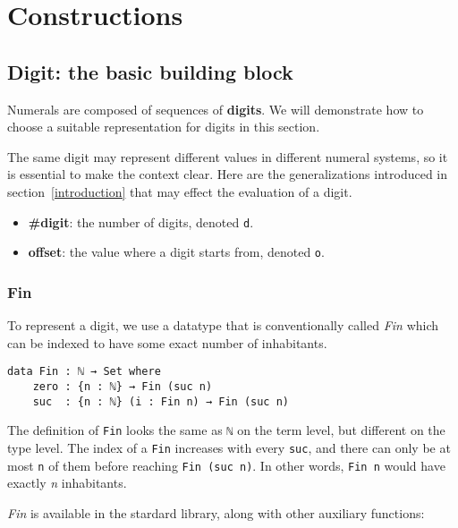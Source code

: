 \documentclass[../thesis.tex]{subfiles}
\begin{document}
\chapter{Constructions}

\section{Digit: the basic building block}\label{digit}

Numerals are composed of sequences of \textbf{digits}. We will demonstrate how
to choose a suitable representation for digits in this section.

The same digit may represent different values in different numeral systems, so it
is essential to make the context clear. Here are the generalizations introduced in
section~\ref{introduction} that may effect the evaluation of a digit.

\begin{itemize}
    \item \textbf{\#digit}: the number of digits, denoted {\lstinline|d|}.
    \item \textbf{offset}: the value where a digit starts from, denoted {\lstinline|o|}.
\end{itemize}


\subsection{Fin}

To represent a digit, we use a datatype that is conventionally called \textit{Fin}
which can be indexed to have some exact number of inhabitants.

\begin{lstlisting}
data Fin : ℕ → Set where
    zero : {n : ℕ} → Fin (suc n)
    suc  : {n : ℕ} (i : Fin n) → Fin (suc n)
\end{lstlisting}

The definition of {\lstinline|Fin|} looks the same as {\lstinline|ℕ|} on the term
level, but different on the type level. The index of a {\lstinline|Fin|} increases
with every {\lstinline|suc|}, and there can only be at most {\lstinline|n|} of
them before reaching {\lstinline|Fin (suc n)|}. In other words, {\lstinline|Fin n|}
would have exactly \textit{n} inhabitants.

\textit{Fin} is available in the stardard library, along with other auxiliary
functions:
\end{document}
